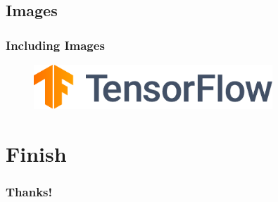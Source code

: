\documentclass{beamer}
\begin{document}
\subsection{Images}
\begin{frame}
	\frametitle{Including Images}

	\begin{figure}
		\centering
		\includegraphics[width=0.8\textwidth]{images/tensorflow.pdf}
	\end{figure}

\end{frame}

\section{Finish}
\begin{frame}
	\frametitle{Thanks!}
\end{frame}
\end{document}
